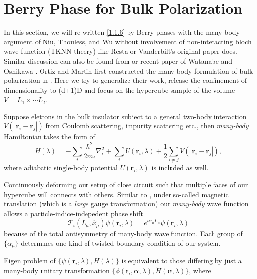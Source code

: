 \documentclass[10pt,nofootinbib]{revtex4}
\begin{document}
\section{Berry Phase for Bulk Polarization}
	In this section, we will re-written \eqref{1.1.6} by Berry phases with the many-body argument of Niu, Thouless, and Wu \cite{Niu1985quantized} without involvement of non-interacting bloch wave function (TKNN theory) like Resta or Vanderbilt's original paper \cite{king1993theory,resta2007theory} does. Similar discussion can also be found from \cite{ortiz1994macroscopic} or recent paper of Watanabe and Oshikawa \cite{Watanabe2018inequivalent}.
		Ortiz and Martin first constructed the many-body formulation of bulk polarization in \cite{ortiz1994macroscopic}. Here we try to generalize their work, release the confinement of dimensionality to (d+1)D and focus on the hypercube sample of the volume $V=L_1\times\cdots L_d$.\par
		Suppose eletrons in the bulk insulator subject to a general two-body interaction $V(|\bm{r}_i-\bm{r}_j|)$ from Coulomb scattering, impurity scattering etc., then \emph{many-body} Hamiltonian takes the form of
		\begin{equation}\label{2.1.1}
			H(\lambda)=-\sum_i\dfrac{\hbar^2}{2m_i}\nabla_i^2+\sum_i U(\bm{r}_i,\lambda)+\dfrac{1}{2}\sum_{i\neq j}V(|\bm{r}_i-\bm{r}_j|),
		\end{equation}
		where adiabatic single-body potential $U(\bm{r}_i,\lambda)$ is included as well.\par
		Continuously deforming our setup of close circuit such that multiple faces of our hypercube will connects with others. Similar to \cite{Niu1985quantized}, under so-called magnetic translation \cite{zak1964magnetic} (which is a \emph{large} gauge transformation) our \emph{many-body} wave function allows a particle-indice-indepedent phase shift \cite{Fradkin2013Field}
		\begin{equation}\label{2.1.2}
			\mathscr{T}_i(L_\mu,\hat{x}_\mu)\psi(\bm{r}_i,\lambda)=e^{i \alpha_\mu L_\mu}\psi(\bm{r}_i,\lambda)
		\end{equation}
		because of the total antisymmetry of many-body wave function. Each group of $\{\alpha_\mu\}$ determines one kind of twisted boundary condition of our system.\par
		Eigen problem of $\{\psi(\bm{r}_i,\lambda),H(\lambda)\}$ is equivalent to those differing by just a many-body unitary transformation $\{\phi(\bm{r}_i,\bm{\alpha},\lambda),\widetilde{H}(\bm{\alpha},\lambda)\}$, where
\end{document}
